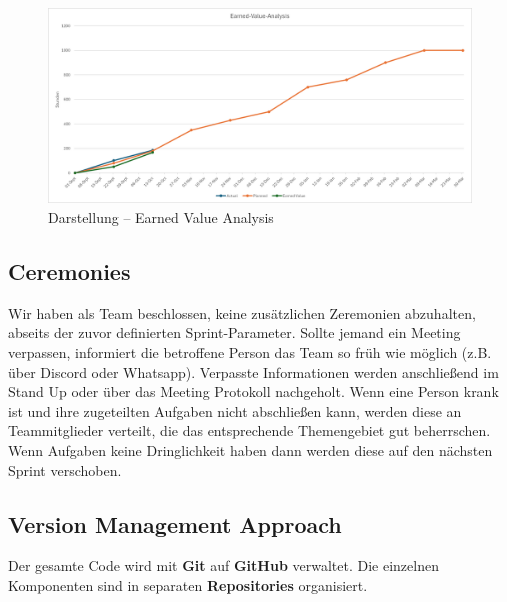 \documentclass{article}
\begin{document}
\begin{figure}[H]
  \centering
  \includegraphics[width=\textwidth]{EVA.png}
  \caption{Darstellung – Earned Value Analysis}
  \label{fig:eva}
\end{figure}






\subsection{Ceremonies}
Wir haben als Team beschlossen, keine zusätzlichen Zeremonien abzuhalten, abseits der zuvor definierten Sprint-Parameter. Sollte jemand ein Meeting verpassen, informiert die betroffene Person das Team so früh wie möglich (z.B. über Discord oder Whatsapp). Verpasste Informationen werden anschließend im Stand Up oder über das Meeting Protokoll nachgeholt. Wenn eine Person krank ist und ihre zugeteilten Aufgaben nicht abschließen kann, werden diese an Teammitglieder verteilt, die das entsprechende Themengebiet gut beherrschen. Wenn Aufgaben keine Dringlichkeit haben dann werden diese auf den nächsten Sprint verschoben.





\subsection{Version Management Approach}

Der gesamte Code wird mit \textbf{Git} auf \textbf{GitHub} verwaltet.
Die einzelnen Komponenten sind in separaten \textbf{Repositories} organisiert.
\end{document}
